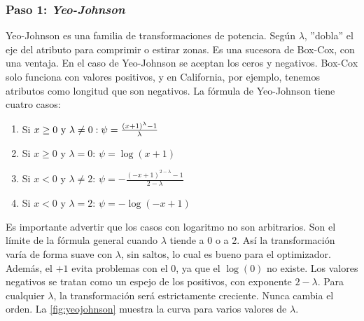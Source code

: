 \subsubsection{Paso 1: \textit{Yeo-Johnson}}
Yeo-Johnson es una familia de transformaciones de potencia. Según $\lambda$, ''dobla'' el eje del atributo para comprimir o estirar zonas. Es una sucesora de Box-Cox, con una ventaja. En el caso de Yeo-Johnson se aceptan los ceros y negativos. Box-Cox solo funciona con valores positivos, y en California, por ejemplo, tenemos atributos como longitud que son negativos. La fórmula de Yeo-Johnson tiene cuatro casos: 
\begin{enumerate}
    \item Si $x\geq 0\space \text{ y } \lambda \neq 0: \psi=\frac{(x+1)^{\lambda}-1}{\lambda}$
    \item Si $x \geq 0$ y $\lambda =0$: $\psi = \log(x+1)$
    \item Si $x < 0$ y $\lambda \neq 2$: $\psi=-\frac{(-x+1)^{2-\lambda}-1}{2-\lambda}$
    \item Si $x<0$ y $\lambda=2$: $\psi=-\log(-x+1)$
\end{enumerate}

Es importante advertir que los casos con logaritmo no son arbitrarios. Son el límite de la fórmula general cuando $\lambda$ tiende a 0 o a 2. Así la transformación varía de forma suave con $\lambda$, sin saltos, lo cual es bueno para el optimizador. Además, el $+1$ evita problemas con el 0, ya que el $\log(0)$ no existe. Los valores negativos se tratan como un espejo de los positivos, con exponente $2-\lambda$. Para cualquier $\lambda$, la transformación será estrictamente creciente. Nunca cambia el orden. La \autoref{fig:yeojohnson} muestra la curva para varios valores de $\lambda$.

